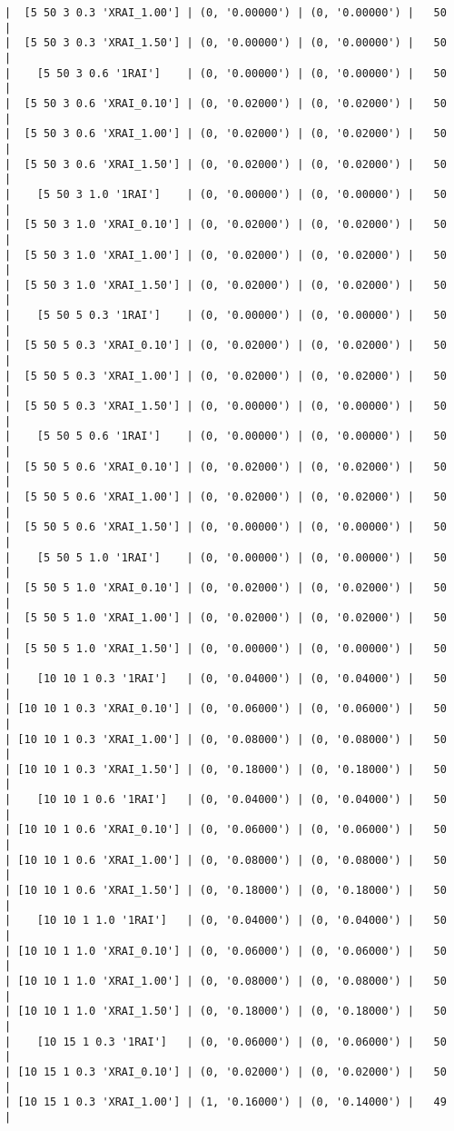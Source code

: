 \documentclass{article}
\begin{document}
\begin{verbatim}
|  [5 50 3 0.3 'XRAI_1.00'] | (0, '0.00000') | (0, '0.00000') |   50  |
|  [5 50 3 0.3 'XRAI_1.50'] | (0, '0.00000') | (0, '0.00000') |   50  |
|    [5 50 3 0.6 '1RAI']    | (0, '0.00000') | (0, '0.00000') |   50  |
|  [5 50 3 0.6 'XRAI_0.10'] | (0, '0.02000') | (0, '0.02000') |   50  |
|  [5 50 3 0.6 'XRAI_1.00'] | (0, '0.02000') | (0, '0.02000') |   50  |
|  [5 50 3 0.6 'XRAI_1.50'] | (0, '0.02000') | (0, '0.02000') |   50  |
|    [5 50 3 1.0 '1RAI']    | (0, '0.00000') | (0, '0.00000') |   50  |
|  [5 50 3 1.0 'XRAI_0.10'] | (0, '0.02000') | (0, '0.02000') |   50  |
|  [5 50 3 1.0 'XRAI_1.00'] | (0, '0.02000') | (0, '0.02000') |   50  |
|  [5 50 3 1.0 'XRAI_1.50'] | (0, '0.02000') | (0, '0.02000') |   50  |
|    [5 50 5 0.3 '1RAI']    | (0, '0.00000') | (0, '0.00000') |   50  |
|  [5 50 5 0.3 'XRAI_0.10'] | (0, '0.02000') | (0, '0.02000') |   50  |
|  [5 50 5 0.3 'XRAI_1.00'] | (0, '0.02000') | (0, '0.02000') |   50  |
|  [5 50 5 0.3 'XRAI_1.50'] | (0, '0.00000') | (0, '0.00000') |   50  |
|    [5 50 5 0.6 '1RAI']    | (0, '0.00000') | (0, '0.00000') |   50  |
|  [5 50 5 0.6 'XRAI_0.10'] | (0, '0.02000') | (0, '0.02000') |   50  |
|  [5 50 5 0.6 'XRAI_1.00'] | (0, '0.02000') | (0, '0.02000') |   50  |
|  [5 50 5 0.6 'XRAI_1.50'] | (0, '0.00000') | (0, '0.00000') |   50  |
|    [5 50 5 1.0 '1RAI']    | (0, '0.00000') | (0, '0.00000') |   50  |
|  [5 50 5 1.0 'XRAI_0.10'] | (0, '0.02000') | (0, '0.02000') |   50  |
|  [5 50 5 1.0 'XRAI_1.00'] | (0, '0.02000') | (0, '0.02000') |   50  |
|  [5 50 5 1.0 'XRAI_1.50'] | (0, '0.00000') | (0, '0.00000') |   50  |
|    [10 10 1 0.3 '1RAI']   | (0, '0.04000') | (0, '0.04000') |   50  |
| [10 10 1 0.3 'XRAI_0.10'] | (0, '0.06000') | (0, '0.06000') |   50  |
| [10 10 1 0.3 'XRAI_1.00'] | (0, '0.08000') | (0, '0.08000') |   50  |
| [10 10 1 0.3 'XRAI_1.50'] | (0, '0.18000') | (0, '0.18000') |   50  |
|    [10 10 1 0.6 '1RAI']   | (0, '0.04000') | (0, '0.04000') |   50  |
| [10 10 1 0.6 'XRAI_0.10'] | (0, '0.06000') | (0, '0.06000') |   50  |
| [10 10 1 0.6 'XRAI_1.00'] | (0, '0.08000') | (0, '0.08000') |   50  |
| [10 10 1 0.6 'XRAI_1.50'] | (0, '0.18000') | (0, '0.18000') |   50  |
|    [10 10 1 1.0 '1RAI']   | (0, '0.04000') | (0, '0.04000') |   50  |
| [10 10 1 1.0 'XRAI_0.10'] | (0, '0.06000') | (0, '0.06000') |   50  |
| [10 10 1 1.0 'XRAI_1.00'] | (0, '0.08000') | (0, '0.08000') |   50  |
| [10 10 1 1.0 'XRAI_1.50'] | (0, '0.18000') | (0, '0.18000') |   50  |
|    [10 15 1 0.3 '1RAI']   | (0, '0.06000') | (0, '0.06000') |   50  |
| [10 15 1 0.3 'XRAI_0.10'] | (0, '0.02000') | (0, '0.02000') |   50  |
| [10 15 1 0.3 'XRAI_1.00'] | (1, '0.16000') | (0, '0.14000') |   49  |

\end{verbatim}
\end{document}
